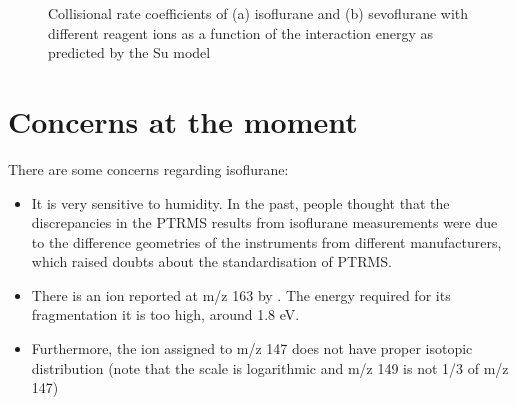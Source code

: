 \begin{figure}%
\centering
{}

\caption{Collisional rate coefficients of (a) isoflurane and (b) sevoflurane with different reagent ions as a function of the interaction energy as predicted by the Su model \cite{su1994parametrization}}
    \label{fig:rate_iso_sevo}
\end{figure}



\section{Concerns at the moment}
There are some concerns regarding isoflurane:
\begin{itemize}
    \item It is very sensitive to humidity. In the past, people thought that the discrepancies in the PTRMS results from isoflurane measurements were due to the difference geometries of the instruments from different manufacturers, which raised doubts about the standardisation of PTRMS.
    \item There is an ion reported at m/z 163 by \cite{smith2003analysis}. The energy required for its fragmentation it is too high, around 1.8 eV.
    \item Furthermore, the ion assigned to m/z 147 does not have proper isotopic distribution (note that the scale is logarithmic and m/z 149 is not 1/3 of m/z  147)
\end{itemize}




